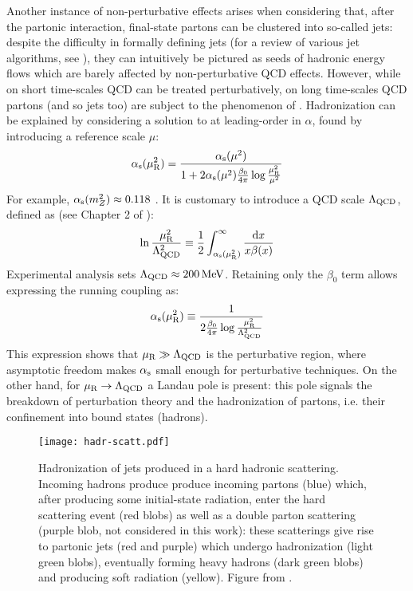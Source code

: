 Another instance of non-perturbative effects arises when considering that, after the partonic interaction, final-state partons can be clustered into so-called jets: despite the difficulty in formally defining jets (for a review of various jet algorithms, see \cite{Salam-2010}), they can intuitively be pictured as seeds of hadronic energy flows which are barely affected by non-perturbative QCD effects. However, while on short time-scales QCD can be treated perturbatively, on long time-scales QCD partons (and so jets too) are subject to the phenomenon of . Hadronization can be explained by considering a solution to  at leading-order in $ \alpha $, found by introducing a reference scale $ \mu $:
\begin{equation}
  \alpha_\text{s}(\mu_\text{R}^2) = \frac{\alpha_\text{s}(\mu^2)}{1 + 2 \alpha_\text{s}(\mu^2) \frac{\beta_0}{4\pi} \log \frac{\mu_\text{R}^2}{\mu^2}}
\end{equation}
For example, $ \alpha_\text{s}(m_Z^2) \approx 0.118 $ \cite{PDG-2024}. It is customary to introduce a QCD scale $ \Lambda_\text{QCD} $, defined as (see Chapter 2 of \cite{Ellis-1996}):
\begin{equation}
  \ln \frac{\mu_\text{R}^2}{\Lambda_\text{QCD}^2} \equiv \frac{1}{2} \int_{\alpha_\text{s}(\mu_\text{R}^2)}^\infty \frac{\mathrm{d} x}{x \beta(x)}
\end{equation}
Experimental analysis sets $ \Lambda_\text{QCD} \approx 200\,\mathrm{MeV} $. Retaining only the $ \beta_0 $ term allows expressing the running coupling as:
\begin{equation}
  \alpha_\text{s}(\mu_\text{R}^2) \equiv \frac{1}{2\frac{\beta_0}{4\pi} \log \frac{\mu_\text{R}^2}{\Lambda_\text{QCD}^2}}
\end{equation}
This expression shows that $ \mu_\text{R} \gg \Lambda_\text{QCD} $ is the perturbative region, where asymptotic freedom makes $ \alpha_\text{s} $ small enough for perturbative techniques. On the other hand, for $ \mu_\text{R} \rightarrow \Lambda_\text{QCD} $ a Landau pole is present: this pole signals the breakdown of perturbation theory and the hadronization of partons, i.e. their confinement into bound states (hadrons).

\begin{figure}
  \centering
  \texttt{[image: hadr-scatt.pdf]}
  \caption{Hadronization of jets produced in a hard hadronic scattering. Incoming hadrons produce produce incoming partons (blue) which, after producing some initial-state radiation, enter the hard scattering event (red blobs) as well as a double parton scattering (purple blob, not considered in this work): these scatterings give rise to partonic jets (red and purple) which undergo hadronization (light green blobs), eventually forming heavy hadrons (dark green blobs) and producing soft radiation (yellow). Figure from \cite{Hoche-2014}.}
  \label{fig:hadr-scatt}
\end{figure}


